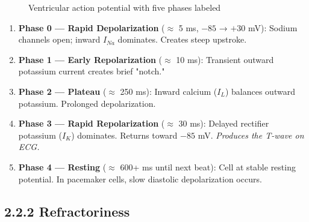 \documentclass[12pt,oneside,a4paper]{book}
\begin{document}
\begin{figure}[H]
\centering
{}
\caption{Ventricular action potential with five phases labeled}
\label{fig:ap_five_phases}
\end{figure}

\begin{enumerate}
  \item \textbf{Phase 0 — Rapid Depolarization} (\(\approx\) 5 ms, $-85$ → $+30$ mV):
    Sodium channels open; inward $I_{Na}$ dominates. Creates steep upstroke.

  \item \textbf{Phase 1 — Early Repolarization} (\(\approx\) 10 ms):
    Transient outward potassium current creates brief "notch."

  \item \textbf{Phase 2 — Plateau} (\(\approx\) 250 ms):
    Inward calcium ($I_L$) balances outward potassium. Prolonged depolarization.

  \item \textbf{Phase 3 — Rapid Repolarization} (\(\approx\) 30 ms):
    Delayed rectifier potassium ($I_K$) dominates. Returns toward $-85$ mV.
    \textit{Produces the T-wave on ECG.}

  \item \textbf{Phase 4 — Resting} (\(\approx\) 600+ ms until next beat):
    Cell at stable resting potential. In pacemaker cells, slow diastolic depolarization occurs.
\end{enumerate}

\subsection{2.2.2 Refractoriness}
\end{document}
